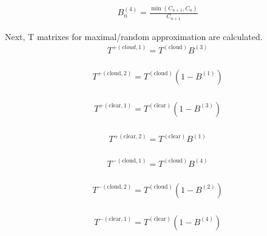 \begin{equation}
\begin{array}{l}
B_{n}^{(4)}=\frac{\min \left(C_{n+1}, C_{n}\right)}{C_{n+1}}
\end{array}
\end{equation}

Next, T matrixes for maximal/random approximation are calculated. \begin{equation}
\begin{array}{l}
T^{+(cloud, 1)}=T^{(\text {cloud})} B^{(3)} \\
\end{array}
\end{equation}

\begin{equation}
\begin{array}{l}
T^{+(\text {cloud}, 2)}=T^{(\text {cloud})}\left(1-B^{(1)}\right)\\
\end{array}
\end{equation}

\begin{equation}
\begin{array}{l}
T^{+(\text {clear}, 1)}=T^{(\text {clear})}\left(1-B^{(3)}\right)\\
\end{array}
\end{equation}

\begin{equation}
\begin{array}{l}
T^{+(\text {clear}, 2)}=T^{(\text {clear})} B^{(1)} \\
\end{array}
\end{equation}

\begin{equation}
\begin{array}{l}
T^{-(\text {cloud}, 1)}=T^{(\text {cloud})} B^{(4)} \\
\end{array}
\end{equation}

\begin{equation}
\begin{array}{l}
T^{-(\text {cloud}, 2)}=T^{(\text {cloud})}\left(1-B^{(2)}\right)\\
\end{array}
\end{equation}

\begin{equation}
\begin{array}{l}
T^{-(\text {clear}, 1)}=T^{(\text {clear})}\left(1-B^{(4)}\right)\\
\end{array}
\end{equation}

